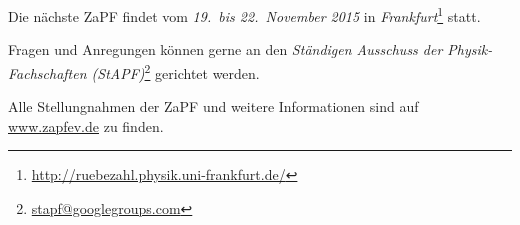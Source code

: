 \documentclass{scrartcl}
\begin{document}
\vspace{0.5cm}
Die nächste ZaPF findet vom \emph{19.\ bis 22.\ November 2015} in \emph{Frankfurt}\footnote{\href{http://ruebezahl.physik.uni-frankfurt.de/}{\url{http://ruebezahl.physik.uni-frankfurt.de/}}} statt.

Fragen und Anregungen können gerne an den \emph{Ständigen Ausschuss der Physik-Fachschaften (StAPF)}\footnote{\href{mailto:stapf@googlegroups.com}{\url{stapf@googlegroups.com}}} gerichtet werden.

Alle Stellungnahmen der ZaPF und weitere Informationen sind auf \href{http://www.zapfev.de}{\url{www.zapfev.de}} zu finden.
\end{document}
